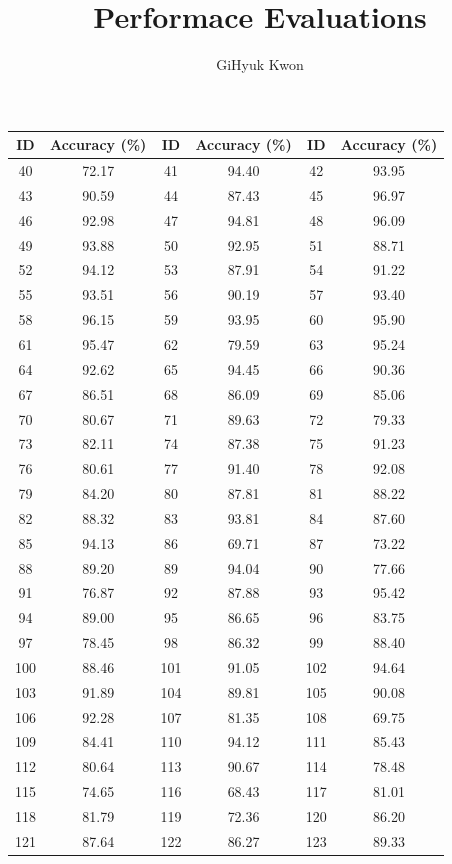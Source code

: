 \documentclass{article}
\title{Performace Evaluations}
\author{GiHyuk Kwon}
\begin{document}
\begin{table}[H]
\centering
\begin{tabular*}{\textwidth}{@{\extracolsep{\fill}}cccccc}
\toprule
\textbf{ID} & \textbf{Accuracy (\%)} & \textbf{ID} & \textbf{Accuracy (\%)} & \textbf{ID} & \textbf{Accuracy (\%)} \\
\midrule
    40 & 72.17 & 41 & 94.40 & 42 & 93.95 \\
43 & 90.59 & 44 & 87.43 & 45 & 96.97 \\
46 & 92.98 & 47 & 94.81 & 48 & 96.09 \\
49 & 93.88 & 50 & 92.95 & 51 & 88.71 \\
52 & 94.12 & 53 & 87.91 & 54 & 91.22 \\
55 & 93.51 & 56 & 90.19 & 57 & 93.40 \\
58 & 96.15 & 59 & 93.95 & 60 & 95.90 \\
61 & 95.47 & 62 & 79.59 & 63 & 95.24 \\
64 & 92.62 & 65 & 94.45 & 66 & 90.36 \\
67 & 86.51 & 68 & 86.09 & 69 & 85.06 \\
70 & 80.67 & 71 & 89.63 & 72 & 79.33 \\
73 & 82.11 & 74 & 87.38 & 75 & 91.23 \\
76 & 80.61 & 77 & 91.40 & 78 & 92.08 \\
79 & 84.20 & 80 & 87.81 & 81 & 88.22 \\
82 & 88.32 & 83 & 93.81 & 84 & 87.60 \\
85 & 94.13 & 86 & 69.71 & 87 & 73.22 \\
88 & 89.20 & 89 & 94.04 & 90 & 77.66 \\
91 & 76.87 & 92 & 87.88 & 93 & 95.42 \\
94 & 89.00 & 95 & 86.65 & 96 & 83.75 \\
97 & 78.45 & 98 & 86.32 & 99 & 88.40 \\
100 & 88.46 & 101 & 91.05 & 102 & 94.64 \\
103 & 91.89 & 104 & 89.81 & 105 & 90.08 \\
106 & 92.28 & 107 & 81.35 & 108 & 69.75 \\
109 & 84.41 & 110 & 94.12 & 111 & 85.43 \\
112 & 80.64 & 113 & 90.67 & 114 & 78.48 \\
115 & 74.65 & 116 & 68.43 & 117 & 81.01 \\
118 & 81.79 & 119 & 72.36 & 120 & 86.20 \\
121 & 87.64 & 122 & 86.27 & 123 & 89.33 \\

\end{tabular*}
\end{table}
\end{document}
